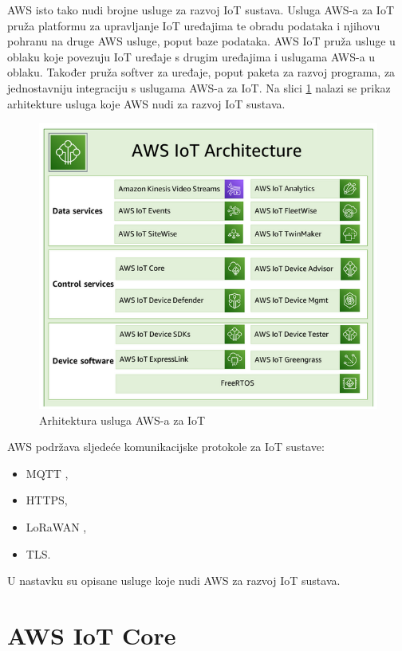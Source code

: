 AWS isto tako nudi brojne usluge za razvoj IoT sustava. Usluga AWS-a za IoT pruža platformu za upravljanje IoT uređajima te obradu podataka i njihovu pohranu na druge AWS usluge, poput baze podataka. AWS IoT pruža usluge u oblaku koje povezuju IoT uređaje s drugim uređajima i uslugama AWS-a u oblaku. Također pruža softver za uređaje, poput paketa za razvoj programa, za jednostavniju integraciju s uslugama AWS-a za IoT. Na slici \ref{fig:aws_iot_arch} nalazi se prikaz arhitekture usluga koje AWS nudi za razvoj IoT sustava.

\begin{figure}[ht]
	\centering
	\includegraphics[scale=0.8]{imgs/aws_iot_arch}
	\caption{Arhitektura usluga AWS-a za IoT \cite{aws_docs}}
	\label{fig:aws_iot_arch}
\end{figure}

AWS podržava sljedeće komunikacijske protokole za IoT sustave:
\begin{itemize}
	\item MQTT ,
	\item HTTPS,
	\item LoRaWAN ,
	\item TLS.
\end{itemize}

U nastavku su opisane usluge koje nudi AWS za razvoj IoT sustava.

\section{AWS IoT Core}

